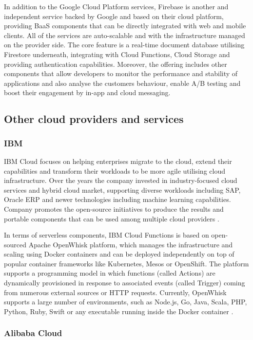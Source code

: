 In addition to the Google Cloud Platform services, Firebase \cite{Firebase} is another and independent service backed by Google and based on their cloud platform, providing BaaS components that can be directly integrated with web and mobile clients. All of the services are auto-scalable and with the infrastructure managed on the provider side. The core feature is a real-time document database utilising Firestore underneath, integrating with Cloud Functions, Cloud Storage and providing authentication capabilities. Moreover, the offering includes other components that allow developers to monitor the performance and stability of applications and also analyse the customers behaviour, enable A/B testing and boost their engagement by in-app and cloud messaging.

\subsection{Other cloud providers and services}

\subsubsection{IBM}
IBM Cloud focuses on helping enterprises migrate to the cloud, extend their capabilities and transform their workloads to be more agile utilising cloud infrastructure. Over the years the company invested in industry-focused cloud services and hybrid cloud market, supporting diverse workloads including SAP, Oracle ERP and newer technologies including machine learning capabilities. Company promotes the open-source initiatives to produce the results and portable components that can be used among multiple cloud providers \cite{Gartner}.

In terms of serverless components, IBM Cloud Functions is based on open-sourced Apache OpenWhisk platform, which manages the infrastructure and scaling using Docker containers and can be deployed independently on top of popular container frameworks like Kubernetes, Mesos or OpenShift. The platform supports a programming model in which functions (called Actions) are dynamically provisioned in response to associated events (called Trigger) coming from numerous external sources or HTTP requests. Currently, OpenWhisk supports a large number of environments, such as Node.js, Go, Java, Scala, PHP, Python, Ruby, Swift or any executable running inside the Docker container \cite{ApacheOpenWhisk}.

\subsubsection{Alibaba Cloud}


